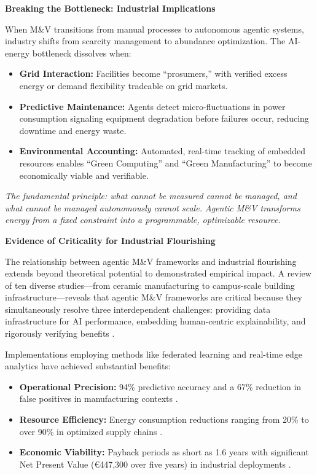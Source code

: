 \documentclass[11pt,a4paper]{article}
\begin{document}
\begin{itemize}
    \textbf{Breaking the Bottleneck: Industrial Implications}
    
    When M\&V transitions from manual processes to autonomous agentic systems, industry shifts from scarcity management to abundance optimization. The AI-energy bottleneck dissolves when:
    \begin{itemize}
        \item \textbf{Grid Interaction:} Facilities become ``prosumers,'' with verified excess energy or demand flexibility tradeable on grid markets.
        \item \textbf{Predictive Maintenance:} Agents detect micro-fluctuations in power consumption signaling equipment degradation before failures occur, reducing downtime and energy waste.
        \item \textbf{Environmental Accounting:} Automated, real-time tracking of embedded resources enables ``Green Computing'' and ``Green Manufacturing'' to become economically viable and verifiable.
    \end{itemize}
    
    \textit{The fundamental principle: what cannot be measured cannot be managed, and what cannot be managed autonomously cannot scale. Agentic M\&V transforms energy from a fixed constraint into a programmable, optimizable resource.}

    \textbf{Evidence of Criticality for Industrial Flourishing}
    
    The relationship between agentic M\&V frameworks and industrial flourishing extends beyond theoretical potential to demonstrated empirical impact. A review of ten diverse studies—from ceramic manufacturing to campus-scale building infrastructure—reveals that agentic M\&V frameworks are critical because they simultaneously resolve three interdependent challenges: providing data infrastructure for AI performance, embedding human-centric explainability, and rigorously verifying benefits \cite{fernandez2025, moraliyage2022}.
    
    Implementations employing methods like federated learning and real-time edge analytics have achieved substantial benefits:
    \begin{itemize}
        \item \textbf{Operational Precision:} 94\% predictive accuracy and a 67\% reduction in false positives in manufacturing contexts \cite{fernandez2025}.
        \item \textbf{Resource Efficiency:} Energy consumption reductions ranging from 20\% to over 90\% in optimized supply chains \cite{ranpara2025, gosmar2025}.
        \item \textbf{Economic Viability:} Payback periods as short as 1.6 years with significant Net Present Value (€447,300 over five years) in industrial deployments \cite{fernandez2025}.
    \end{itemize}
    

\end{itemize}
\end{document}
